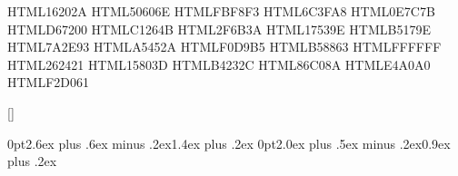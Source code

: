 \definecolor{ink}      {HTML}{16202A}
\definecolor{inksoft}  {HTML}{50606E}
\definecolor{paper}    {HTML}{FBF8F3}
\definecolor{kqk}      {HTML}{6C3FA8}   %
\definecolor{krk}      {HTML}{0E7C7B}   %
\definecolor{kbbk}     {HTML}{D67200}   %
\definecolor{kbnk}     {HTML}{C1264B}   %
\definecolor{kqkr}     {HTML}{2F6B3A}   %
\definecolor{kqkk}     {HTML}{17539E}   %
\definecolor{knnnk}    {HTML}{B5179E}   %
\definecolor{knnk}     {HTML}{7A2E93}   %
\definecolor{kings}    {HTML}{A5452A}   %
\definecolor{sqlight}  {HTML}{F0D9B5}
\definecolor{sqdark}   {HTML}{B58863}
\definecolor{manwhite} {HTML}{FFFFFF}
\definecolor{manblack} {HTML}{262421}
\definecolor{arrowW}   {HTML}{15803D}   %
\definecolor{arrowB}   {HTML}{B4232C}   %
\definecolor{hlwin}    {HTML}{86C08A}
\definecolor{hldraw}   {HTML}{E4A0A0}
\definecolor{hlmark}   {HTML}{F2D061}

\newfontfamily{}

\titleformat{\section}{\Large\bfseries\color{ink}}{\thesection}{0.6em}{}[{\color{ink!25}\titlerule[1pt]}]
\titleformat{\subsection}{\large\bfseries\color{inksoft}}{\thesubsection}{0.6em}{}
\titleformat{\subsubsection}{\normalsize\bfseries\color{inksoft}}{\thesubsubsection}{0.6em}{}
\titlespacing*{\section}      {0pt}{2.6ex plus .6ex minus .2ex}{1.4ex plus .2ex}
\titlespacing*{\subsection}   {0pt}{2.0ex plus .5ex minus .2ex}{0.9ex plus .2ex}


